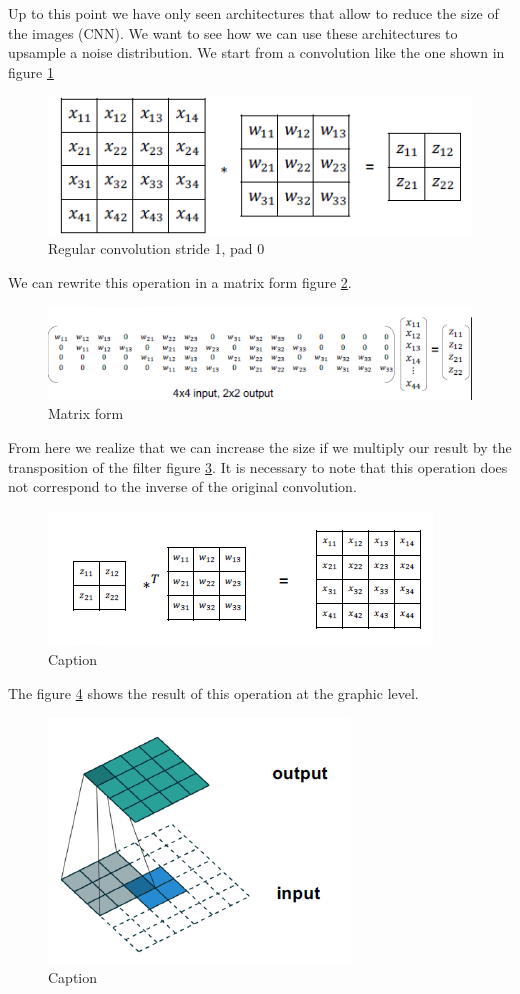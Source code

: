 Up to this point we have only seen architectures that allow to reduce the size of the images (CNN). We
want to see how we can use these architectures to upsample a noise distribution. We start from a 
convolution like the one shown in figure \ref{fig:reg-conv}

\begin{figure}[!ht]
    \centering
    \includegraphics[width=0.5\linewidth]{img/GAN/RegularConv.png}
    \caption{Regular convolution stride 1, pad 0}
    \label{fig:reg-conv}
\end{figure}

We can rewrite this operation in a matrix form figure \ref{fig:conmat}.

\begin{figure}[!ht]
    \centering
    \includegraphics[width=0.5\linewidth]{img/GAN/matrix-vector.png}
    \caption{Matrix form}
    \label{fig:conmat}
\end{figure}

From here we realize that we can increase the size if we multiply our result by the transposition of the 
filter figure \ref{fig:traConv}. It is necessary to note that this operation does not correspond to the inverse of the original convolution.

\begin{figure}[!ht]
    \centering
    \includegraphics[width=0.5\linewidth]{img/GAN/transposeConv.png}
    \caption{Caption}
    \label{fig:traConv}
\end{figure}

The figure \ref{fig:TConvRes} shows the result of this operation at the graphic level.

\begin{figure}[!ht]
    \centering
    \includegraphics[width=0.5\linewidth]{img/GAN/results.png}
    \caption{Caption}
    \label{fig:TConvRes}
\end{figure}

